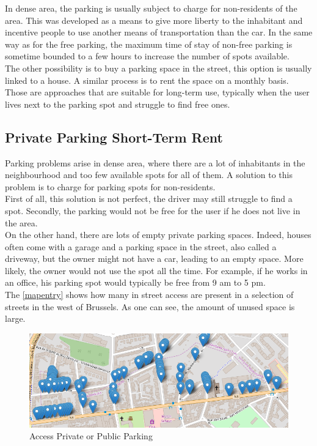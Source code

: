 \documentclass[12pt,a4paper,oneside]{book}
\begin{document}
In dense area, the parking is usually subject to charge for non-residents of the area. This was developed as a means to give more liberty to the inhabitant and incentive people to use another means of transportation than the car.\cite{nycar} In the same way as for the free parking, the maximum time of stay of non-free parking is sometime bounded to a few hours to increase the number of spots available.\cite{bxpay} \\

The other possibility is to buy a parking space in the street, this option is usually linked to a house. A similar process is to rent the space on a monthly basis. Those are approaches that are suitable for long-term use, typically when the user lives next to the parking spot and struggle to find free ones.

\subsection{Private Parking Short-Term Rent}
Parking problems arise in dense area, where there are a lot of inhabitants in the neighbourhood and too few available spots for all of them. A solution to this problem is to charge for parking spots for non-residents.\\

First of all, this solution is not perfect, the driver may still struggle to find a spot. Secondly, the parking would not be free for the user if he does not live in the area.\\

On the other hand, there are lots of empty private parking spaces. Indeed, houses often come with a garage and a parking space in the street, also called a driveway, but the owner might not have a car, leading to an empty space. More likely, the owner would not use the spot all the time. For example, if he works in an office, his parking spot would typically be free from 9 am to 5 pm.\\

The \autoref{mapentry} shows how many in street access are present in a selection of streets in the west of Brussels. As one can see, the amount of unused space is large.\\


\begin{figure}[h]
\centering
\caption{Access Private or Public Parking\cite{mapentrysrc}}
\label{mapentry}
\includegraphics[keepaspectratio=true,width=\textwidth-2cm]{../images/casestudyander.png}
\end{figure}
\end{document}
